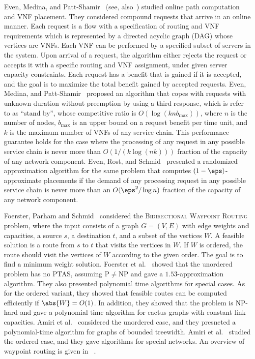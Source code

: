 Even, Medina, and Patt-Shamir~\cite{EMP16} (see, also~\cite{EMP18})
studied online path computation and VNF placement.  They considered
compound requests that arrive in an online manner.  Each request is a
flow with a specification of routing and VNF requirements which is
represented by a directed acyclic graph (DAG) whose vertices are VNFs.
Each VNF can be performed by a specified subset of servers in the
system.  Upon arrival of a request, the algorithm either rejects the
request or accepts it with a specific routing and VNF assignment,
under given server capacity constraints.  Each request has a benefit
that is gained if it is accepted, and the goal is to maximize the
total benefit gained by accepted requests.
%
Even, Medina, and Patt-Shamir~\cite{EMP16} proposed an algorithm that
copes with requests with unknown duration without preemption by using
a third response, which is refer to as “stand by”, whose competitive
ratio is $O(\log (knb_{\max}))$, where $n$ is the number of nodes,
$b_{\max}$ is an upper bound on a request benefit per time unit, and
$k$ is the maximum number of VNFs of any service chain.  This
performance guarantee holds for the case where the processing of any
request in any possible service chain is never more than
$O(1/(k \log (nk)))$ fraction of the capacity of any network
component.
%
Even, Rost, and Schmid~\cite{ERS16} presented a randomized
approximation algorithm for the same problem that computes
$(1-\eps)$-approximate placements if the demand of any processing
request in any possible service chain is never more than an
$O(\eps^2/\log n)$ fraction of the capacity of any network component.

Foerster, Parham and Schmid~\cite{FPS17} considered the
\textsc{Bidirectional Waypoint Routing} problem, where the input
consists of a graph $G = (V,E)$ with edge weights and capacities, a
source $s$, a destination $t$, and a subset of the vertices $W$.  A
feasible solution is a route from $s$ to $t$ that visits the vertices
in $W$.  If $W$ is ordered, the route should visit the vertices of $W$
according to the given order.  The goal is to find a minimum weight
solution.
%
Foerster et al.~\cite{FPS17} showed that the unordered
problem has no PTAS, assuming P$\neq$NP and gave a
$1.53$-approximation algorithm.  They also presented polynomial time
algorithms for special cases.
%
As for the ordered variant, they showed that feasible routes can be
computed efficiently if $\abs{W} = O(1)$.  In addition, they showed
that the problem is NP-hard and gave a polynomial time algorithm for
cactus graphs with constant link capacities.
%
Amiri et al.~\cite{AFS18} considered the unordered case, and they
presneted a polynomial-time algorithm for graphs of bounded treewidth.
%
Amiri et al.~\cite{AFJPS18} studied the ordered case, and they
gave algorithms for special networks.
%
An overview of waypoint routing is given in ~\cite{AFJS18}.

